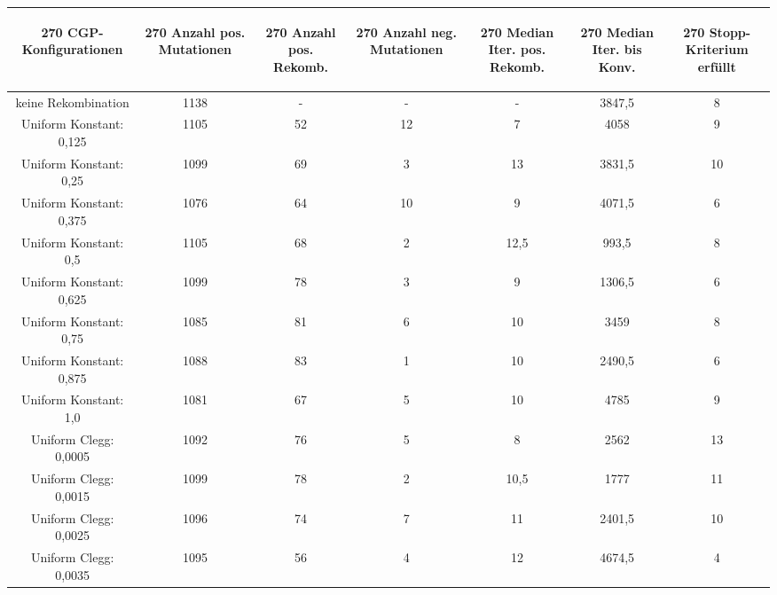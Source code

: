 \begin{table}[H]
	\centering
	\begin{tabular}{c | c | c | c | c | c | c}
		\begin{turn}{270} \textbf{CGP-Konfigurationen} \end{turn} & \begin{turn}{270} \textbf{Anzahl pos. Mutationen} \end{turn} & \begin{turn}{270} \textbf{Anzahl pos. Rekomb.} \end{turn} & \begin{turn}{270} \textbf{Anzahl neg. Mutationen} \end{turn} & \begin{turn}{270} \textbf{Median Iter. pos. Rekomb.} \end{turn} & \begin{turn}{270} \textbf{Median Iter. bis Konv.} \end{turn} & \begin{turn}{270} \textbf{Stopp-Kriterium erfüllt} \end{turn}\\
		\hline
		keine Rekombination & 1138 & - & - & - & 3847,5 & 8\\
		\hline
		Uniform Konstant: 0,125 & 1105 & 52 & 12 & 7 & 4058 & 9\\
		\hline
		Uniform Konstant: 0,25 & 1099 & 69 & 3 & 13 & 3831,5 & 10\\
		\hline
		Uniform Konstant: 0,375 & 1076 & 64 & 10 & 9 & 4071,5 & 6\\
		\hline
		Uniform Konstant: 0,5 & 1105 & 68 & 2 & 12,5 & 993,5 & 8\\
		\hline
		Uniform Konstant: 0,625 & 1099 & 78 & 3 & 9 & 1306,5 & 6\\
		\hline
		Uniform Konstant: 0,75 & 1085 & 81 & 6 & 10 & 3459 & 8\\
		\hline
		Uniform Konstant: 0,875 & 1088 & 83 & 1 & 10 & 2490,5 & 6\\
		\hline
		Uniform Konstant: 1,0 & 1081 & 67 & 5 & 10 & 4785 & 9\\
		\hline
		Uniform Clegg: 0,0005 & 1092 & 76 & 5 & 8 & 2562 & 13\\
		\hline
		Uniform Clegg: 0,0015 & 1099 & 78 & 2 & 10,5 & 1777 & 11\\
		\hline
		Uniform Clegg: 0,0025 & 1096 & 74 & 7 & 11 & 2401,5 & 10\\
		\hline
		Uniform Clegg: 0,0035 & 1095 & 56 & 4 & 12 & 4674,5 & 4\\

\end{tabular}
\end{table}
